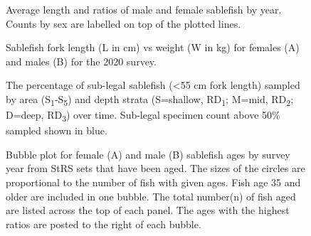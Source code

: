 \documentclass[12pt]{article}\usepackage[]{graphicx}\usepackage[]{color}
\begin{document}
\begin{figure}[htb]

{\centering {} 

}

\caption{Average length and ratios of male and female sablefish by year. Counts by sex are labelled on top of the plotted lines.}\label{fig:figure11}
\end{figure}

\begin{figure}[htb]

{\centering {} 

}

\caption{Sablefish fork length (L in cm) vs weight (W in kg) for females (A) and males (B) for the 2020 survey.}\label{fig:figure12}
\end{figure}

\begin{figure}[htb]

{\centering {} 

}

\caption{The percentage of sub-legal sablefish (\textless55 cm fork length) sampled by area (S\textsubscript{1}-S\textsubscript{5}) and depth strata (S=shallow, RD\textsubscript{1}; M=mid, RD\textsubscript{2}; D=deep, RD\textsubscript{3}) over time. Sub-legal specimen count above 50\% sampled shown in blue.}\label{fig:figure13}
\end{figure}
\clearpage


\begin{figure}[htb]

{\centering {} 

}

\caption{Bubble plot for female (A) and male (B) sablefish ages by survey year from StRS sets that have been aged. The sizes of the circles are proportional to the number of fish with given ages. Fish age 35 and older are included in one bubble. The total number(n) of fish aged are listed across the top of each panel. The ages with the highest ratios are posted to the right of each bubble.}\label{fig:figure14}
\end{figure}
\clearpage
\end{document}
